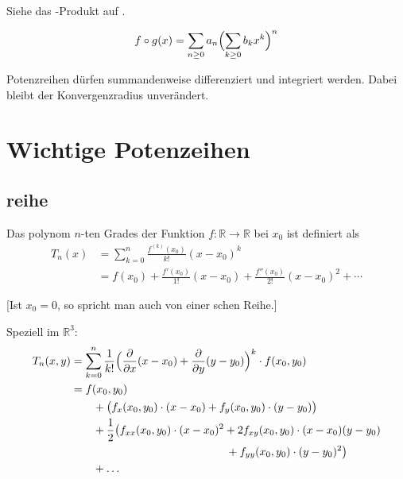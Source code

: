 Siehe das -Produkt auf .

\[ f \circ g(x) = \sum_{n\geq0} a_n \Bigl( \sum_{k\geq0} b_k x^k \Bigr)^n \]

Potenzreihen dürfen summandenweise differenziert und integriert werden. Dabei bleibt der Konvergenzradius unverändert.


\section{Wichtige Potenzeihen}


\subsection{\protect{}reihe}

Das polynom $n$-ten Grades der Funktion $f : \mathbb{R} \to \mathbb{R}$ bei $x_0$ ist definiert als 
\begin{align*}
	T_n(x) & = \sum_{k=0}^n \frac{f^{(k)}(x_0)}{k!} (x-x_0)^k                             \\
	       & = f(x_0) + \frac{f'(x_0)}{1!} (x-x_0) + \frac{f''(x_0)}{2!} (x-x_0)^2+\cdots
\end{align*}

[Ist $x_0=0$, so spricht man auch von einer schen Reihe.]

Speziell im $\mathbb{R}^3$:
\begin{align*}
	T_n(x,y) & = \sum_{k=0}^n \frac{1}{k!} \Bigl(\frac{\partial}{\partial x}(x-x_0)+\frac{\partial}{\partial y}(y-y_0) \Bigr)^k \cdot f(x_0,y_0) \\
	         & = f(x_0,y_0)                                                                                                                      \\
	         & \qquad + \bigl( f_x(x_0,y_0) \cdot (x-x_0) + f_y(x_0,y_0) \cdot (y-y_0) \bigr)                                                    \\
	         & \qquad + \frac{1}{2} \bigl( f_{xx}(x_0,y_0) \cdot (x-x_0)^2 + 2f_{xy}(x_0,y_0) \cdot (x-x_0)(y-y_0)                               \\
	         & \qquad \qquad \qquad \qquad \qquad \qquad \qquad  + f_{yy}(x_0,y_0) \cdot (y-y_0)^2 \bigr)                                        \\
	         & \qquad + \ldots
\end{align*}

